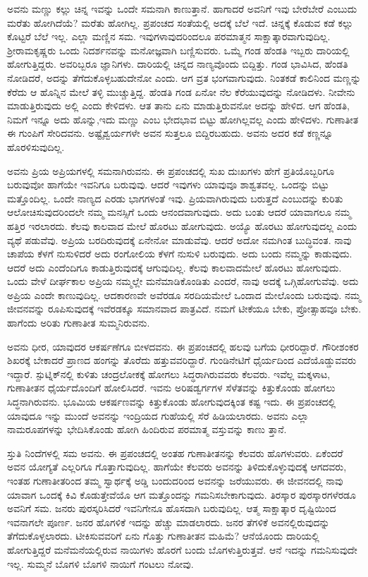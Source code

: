 ಅವನು ಮಣ್ಣು ಕಲ್ಲು ಚಿನ್ನ ಇವನ್ನು ಒಂದೇ ಸಮನಾಗಿ ಕಾಣುತ್ತಾನೆ. ಹಾಗಾದರೆ ಅವನಿಗೆ ಇವು ಬೇರೆಬೇರೆ ಎಂಬುದು ಮರೆತು ಹೋಗಿದೆಯೆ? ಮರೆತು ಹೋಗಿಲ್ಲ. ಪ್ರಪಂಚದ ಸಂತೆಯಲ್ಲಿ ಅದಕ್ಕೆ ಬೆಲೆ ಇದೆ. ಚಿನ್ನಕ್ಕೆ ಕೊಡುವ ಕಡೆ ಕಲ್ಲು ಕೊಟ್ಟರೆ ಬೆಲೆ ಇಲ್ಲ. ಎಲ್ಲಾ ಮಣ್ಣಿನ ಸಮ. ಇವುಗಳಾವುದರಿಂದಲೂ ಪರಮಾತ್ಮನ ಸಾಕ್ಷಾತ್ಕಾರವಾಗುವುದಿಲ್ಲ. ಶ್ರೀರಾಮಕೃಷ್ಣರು ಒಂದು ನಿದರ್ಶನವನ್ನು ಮನೋಜ್ಞವಾಗಿ ಬಣ್ಣಿಸುವರು. ಒಮ್ಮೆ ಗಂಡ ಹೆಂಡತಿ ಇಬ್ಬರು ದಾರಿಯಲ್ಲಿ ಹೋಗುತ್ತಿದ್ದರು. ಅವರಿಬ್ಬರೂ ಜ್ಞಾನಿಗಳು. ದಾರಿಯಲ್ಲಿ ಚಿನ್ನದ ನಾಣ್ಯವೊಂದು ಬಿದ್ದಿತ್ತು. ಗಂಡ ಭಾವಿಸಿದ, ಹೆಂಡತಿ ನೋಡಿದರೆ, ಅದನ್ನು ತೆಗೆದುಕೊಳ್ಳಬಹುದೇನೋ ಎಂದು. ಆಗ ವ್ರತ ಭಂಗವಾಗುವುದು. ನಿಂತಕಡೆ ಕಾಲಿನಿಂದ ಮಣ್ಣನ್ನು ಕೆರೆದು ಆ ಹೊನ್ನಿನ ಮೇಲೆ ತಳ್ಳಿ ಮುಚ್ಚುತ್ತಿದ್ದ. ಹೆಂಡತಿ ಗಂಡ ಏನೋ ನೆಲ ಕೆರೆಯುವುದನ್ನು ನೋಡಿದಳು. ನೀವೇನು ಮಾಡುತ್ತಿರುವುದು ಅಲ್ಲಿ ಎಂದು ಕೇಳಿದಳು. ಆತ ತಾನು ಏನು ಮಾಡುತ್ತಿರುವನೋ ಅದನ್ನು ಹೇಳಿದ. ಆಗ ಹೆಂಡತಿ, ನಿಮಗೆ ಇನ್ನೂ ಅದು ಹೊನ್ನು,ಇದು ಮಣ್ಣು ಎಂಬ ಭೇದಭಾವ ಬಿಟ್ಟು ಹೋಗಿಲ್ಲವಲ್ಲ ಎಂದು ಹೇಳಿದಳು. ಗುಣಾತೀತ ಈ ಗುಂಪಿಗೆ ಸೇರಿದವನು. ಅಷ್ಟೈಶ್ವರ್ಯಗಳೇ ಅವನ ಸುತ್ತಲೂ ಬಿದ್ದಿರಬಹುದು. ಅವನು ಅದರ ಕಡೆ ಕಣ್ಣನ್ನೂ ಹೊರಳಿಸುವುದಿಲ್ಲ.

ಅವನು ಪ್ರಿಯ ಅಪ್ರಿಯಗಳಲ್ಲಿ ಸಮನಾಗಿರುವನು. ಈ ಪ್ರಪಂಚದಲ್ಲಿ ಸುಖ ದುಃಖಗಳು ಹೇಗೆ ಪ್ರತಿಯೊಬ್ಬರಿಗೂ ಬರುವುವೋ ಹಾಗೆಯೇ ಇವನಿಗೂ ಬರುವುವು. ಆದರೆ ಇವುಗಳು ಯಾವುವೂ ಶಾಶ್ವತವಲ್ಲ. ಒಂದನ್ನು ಬಿಟ್ಟು ಮತ್ತೊಂದಿಲ್ಲ. ಒಂದೇ ನಾಣ್ಯದ ಎರಡು ಭಾಗಗಳಂತೆ ಇವು. ಪ್ರಿಯವಾಗಿರುವುದು ಬರುತ್ತದೆ ಎಂಬುದನ್ನು ಕುರಿತು ಆಲೋಚಿಸುವುದರಿಂದಲೇ ನಮ್ಮ ಮನಸ್ಸಿಗೆ ಒಂದು ಆನಂದವಾಗುವುದು. ಅದು ಬಂತು ಆದರೆ ಯಾವಾಗಲೂ ನಮ್ಮ ಹತ್ತಿರ ಇರಲಾರದು. ಕೆಲವು ಕಾಲವಾದ ಮೇಲೆ ಹೊರಟು ಹೋಗುವುದು. ಅಯ್ಯೊ ಹೊರಟು ಹೋಗುವುದಲ್ಲ ಎಂದು ವ್ಯಥೆ ಪಡುವೆವು. ಅಪ್ರಿಯ ಬರದಿರುವುದಕ್ಕೆ ಏನೇನೋ ಮಾಡುವೆವು. ಆದರೆ ಅದೋ ನಮಗಿಂತ ಬುದ್ಧಿವಂತ. ನಾವು ಚಾಪೆಯ ಕೆಳಗೆ ನುಸುಳಿದರೆ ಅದು ರಂಗೋಲಿಯ ಕೆಳಗೆ ನುಸುಳಿ ಬರುವುದು. ಅದು ಬಂದು ನಮ್ಮನ್ನು ಕಾಡುವುದು. ಆದರೆ ಅದು ಎಂದೆಂದಿಗೂ ಕಾಡುತ್ತಿರುವುದಕ್ಕೆ ಆಗುವುದಿಲ್ಲ. ಕೆಲವು ಕಾಲವಾದಮೇಲೆ ಹೊರಟು ಹೋಗುವುದು. ಒಂದು ವೇಳೆ ದೀರ್ಘಕಾಲ ಅಪ್ರಿಯ ನಮ್ಮಲ್ಲೇ ಮನೆಮಾಡಿಕೊಂಡಿತು ಎಂದರೆ, ನಾವು ಅದಕ್ಕೆ ಒಗ್ಗಿಹೋಗುವೆವು. ಅದು ಅಪ್ರಿಯ ಎಂದೇ ಕಾಣುವುದಿಲ್ಲ. ಆದಕಾರಣವೇ ಅವೆರಡೂ ಸರದಿಯಮೇಲೆ ಒಂದಾದ ಮೇಲೊಂದು ಬರುವುವು. ನಮ್ಮ ಜೀವನವನ್ನು ರೂಪಿಸುವುದಕ್ಕೆ ಇವೆರಡಕ್ಕೂ ಸಮಾನವಾದ ಪಾತ್ರವಿದೆ. ನಮಗೆ ಟೀಕೆಯೂ ಬೇಕು, ಪ್ರೋತ್ಸಾಹವೂ ಬೇಕು. ಹಾಗೆಂದು ಅರಿತು ಗುಣಾತೀತ ಸುಮ್ಮನಿರುವನು.

ಅವನು ಧೀರ, ಯಾವುದರ ಆಕರ್ಷಣೆಗೂ ಬೀಳದವನು. ಈ ಪ್ರಪಂಚದಲ್ಲಿ ಹಲವು ಬಗೆಯ ಧೀರರಿದ್ದಾರೆ. ಗೌರೀಶಂಕರ ಶಿಖರಕ್ಕೆ ಬೇಕಾದರೆ ಪ್ರಾಣದ ಹಂಗನ್ನು ತೊರೆದು ಹತ್ತುವವರಿದ್ದಾರೆ. ಗುಂಡಿನೇಟಿಗೆ ಧೈರ್ಯದಿಂದ ಎದೆಯೊಡ್ಡುವವರು ಇದ್ದಾರೆ. ಸ್ಪುಟ್ನಿಕ್​ನಲ್ಲಿ ಕುಳಿತು ಚಂದ್ರಲೋಕಕ್ಕೆ ಹೋಗಲು ಸಿದ್ಧರಾಗಿರುವವರು ಕೆಲವರು. ಇವೆಲ್ಲ ಮಕ್ಕಳಾಟ, ಗುಣಾತೀತನ ಧೈರ್ಯದೊಂದಿಗೆ ಹೋಲಿಸಿದರೆ. ಇವನು ಅರಿಷಡ್ವರ್ಗಗಳ ಸೆಳೆತವನ್ನು ಕಿತ್ತುಕೊಂಡು ಹೋಗಲು ಸಿದ್ಧನಾಗಿರುವನು. ಭೂಮಿಯ ಆಕರ್ಷಣವನ್ನು ಕಿತ್ತುಕೊಂಡು ಹೋಗುವುದಕ್ಕಿಂತ ಕಷ್ಟ ಇದು. ಈ ಪ್ರಪಂಚದಲ್ಲಿ ಯಾವುದೂ ಇನ್ನು ಮುಂದೆ ಅವನನ್ನು ಇಂದ್ರಿಯದ ಗುಹೆಯಲ್ಲಿ ಸೆರೆ ಹಿಡಿಯಲಾರದು. ಅವನು ಎಲ್ಲಾ ನಾಮರೂಪಗಳನ್ನು ಭೇದಿಸಿಕೊಂಡು ಹೋಗಿ ಹಿಂದಿರುವ ಪರಮಾತ್ಮ ವಸ್ತುವನ್ನು ಕಾಣು ತ್ತಾನೆ.

ಸ್ತುತಿ ನಿಂದೆಗಳಲ್ಲಿ ಸಮ ಅವನು. ಈ ಪ್ರಪಂಚದಲ್ಲಿ ಅಂತಹ ಗುಣಾತೀತನನ್ನು ಕೆಲವರು ಹೊಗಳುವರು. ಏಕೆಂದರೆ ಅವನ ಯೋಗ್ಯತೆ ಎಲ್ಲರಿಗೂ ಗೊತ್ತಾಗುವುದಿಲ್ಲ. ಹಾಗೆಯೇ ಕೆಲವರು ಅವನನ್ನು ತಿಳಿದುಕೊಳ್ಳುವುದಕ್ಕೆ ಆಗದವರು, ಇಂತಹ ಗುಣಾತೀತರಿಂದ ತಮ್ಮ ಸ್ವಾರ್ಥಕ್ಕೆ ಅಡ್ಡಿ ಬಂದುದರಿಂದ ಅವನನ್ನು ಜರೆಯುವರು. ಈ ಜೀವನದಲ್ಲಿ ನಾವು ಯಾವಾಗ ಒಂದಕ್ಕೆ ಕಿವಿ ಕೊಡುತ್ತೇವೆಯೊ ಆಗ ಮತ್ತೊಂದನ್ನು ಗಮನಿಸಬೇಕಾಗುವುದು. ತಿರಸ್ಕಾರ ಪುರಸ್ಕಾರಗಳೆರಡೂ ಅವನಿಗೆ ಸಮ. ಜನರು ಪುರಸ್ಕರಿಸಿದರೆ ಇವನಿಗೇನೂ ಹೊಸದಾಗಿ ಬರುವುದಿಲ್ಲ. ಆತ್ಮ ಸಾಕ್ಷಾತ್ಕಾರ ದೃಷ್ಟಿಯಿಂದ ಇವನಾಗಲೇ ಪೂರ್ಣ. ಜನರ ಹೊಗಳಿಕೆ ಇದನ್ನು ಹೆಚ್ಚು ಮಾಡಲಾರದು. ಜನರ ತೆಗಳಿಕೆ ಅವನಲ್ಲಿರುವುದನ್ನು ತೆಗೆದುಕೊಳ್ಳಲಾರದು. ಟೀಕಿಸುವವರಿಗೆ ಏನು ಗೊತ್ತು ಗುಣಾತೀತನ ಮಹಿಮೆ? ಆನೆಯೊಂದು ದಾರಿಯಲ್ಲಿ ಹೋಗುತ್ತಿದ್ದರೆ ಮನೆಮನೆಯಲ್ಲಿರುವ ನಾಯಿಗಳು ಹೊರಗೆ ಬಂದು ಬೊಗಳುತ್ತಿರುತ್ತವೆ. ಆನೆ ಇದನ್ನು ಗಮನಿಸುವುದೇ ಇಲ್ಲ. ಸುಮ್ಮನೆ ಬೊಗಳಿ ಬೊಗಳಿ ನಾಯಿಗೆ ಗಂಟಲು ನೋವು.

